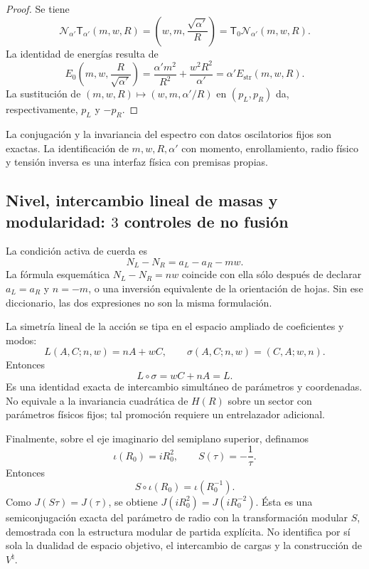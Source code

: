 \begin{proof}
Se tiene
\[
 \mathcal N_{\alpha'}\mathsf T_{\alpha'}(m,w,R)
 =\left(w,m,\frac{\sqrt{\alpha'}}R\right)
 =\mathsf T_0\mathcal N_{\alpha'}(m,w,R).
\]
La identidad de energías resulta de
\[
 E_0\!\left(m,w,\frac R{\sqrt{\alpha'}}\right)
 =\frac{\alpha'm^2}{R^2}+\frac{w^2R^2}{\alpha'}
 =\alpha' E_{\mathrm{str}}(m,w,R).
\]
La sustitución de
\((m,w,R)\mapsto(w,m,\alpha'/R)\) en \((p_L,p_R)\) da, respectivamente,
\(p_L\) y \(-p_R\).
\end{proof}

La conjugación y la invariancia del espectro con datos oscilatorios fijos son
exactas. La identificación de \(m,w,R,\alpha'\) con momento, enrollamiento,
radio físico y tensión inversa es una interfaz física con premisas propias.

\subsection{Nivel, intercambio lineal de masas y modularidad: \(3\) controles de no fusión}

La condición activa de cuerda es
\[
 N_L-N_R=a_L-a_R-mw.
\]
La fórmula esquemática \(N_L-N_R=nw\) coincide con ella sólo
después de declarar \(a_L=a_R\) y \(n=-m\), o una inversión equivalente de
la orientación de hojas. Sin ese diccionario, las dos expresiones no son la
misma formulación.

La simetría lineal de la acción se tipa en el espacio ampliado de
coeficientes y modos:
\[
 L(A,C;n,w)=nA+wC,
 \qquad
 \sigma(A,C;n,w)=(C,A;w,n).
\]
Entonces
\[
 L\circ\sigma=wC+nA=L.
\]
Es una identidad exacta de intercambio simultáneo de parámetros y
coordenadas. No equivale a la invariancia cuadrática de \(H(R)\) sobre un
sector con parámetros físicos fijos; tal promoción requiere un
entrelazador adicional.

Finalmente, sobre el eje imaginario del semiplano superior, definamos
\[
 \iota(R_0)=iR_0^2,
 \qquad S(\tau)=-\frac1\tau.
\]
Entonces
\[
 \boxed{S\circ\iota(R_0)=\iota(R_0^{-1}).}
\]
Como \(J(S\tau)=J(\tau)\), se obtiene
\(J(iR_0^2)=J(iR_0^{-2})\). Ésta es una semiconjugación exacta del parámetro
de radio con la transformación modular \(S\), demostrada con la estructura
modular de partida explícita. No identifica por sí sola la dualidad de
espacio objetivo, el intercambio de cargas y la construcción de
\(V^\natural\).
